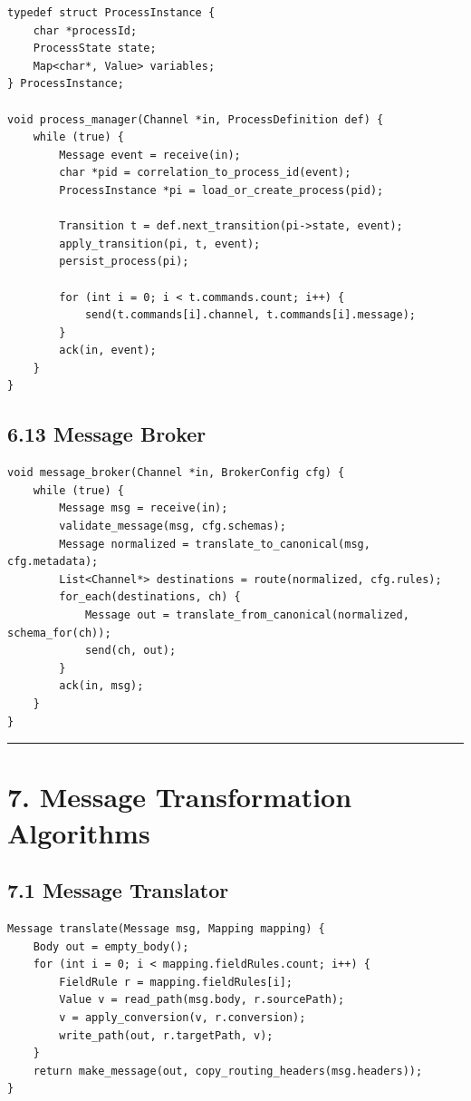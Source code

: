 \documentclass[11pt]{article}
\begin{document}
\begin{verbatim}
typedef struct ProcessInstance {
    char *processId;
    ProcessState state;
    Map<char*, Value> variables;
} ProcessInstance;

void process_manager(Channel *in, ProcessDefinition def) {
    while (true) {
        Message event = receive(in);
        char *pid = correlation_to_process_id(event);
        ProcessInstance *pi = load_or_create_process(pid);

        Transition t = def.next_transition(pi->state, event);
        apply_transition(pi, t, event);
        persist_process(pi);

        for (int i = 0; i < t.commands.count; i++) {
            send(t.commands[i].channel, t.commands[i].message);
        }
        ack(in, event);
    }
}
\end{verbatim}

\subsection{6.13 Message Broker}\label{message-broker}

\begin{verbatim}
void message_broker(Channel *in, BrokerConfig cfg) {
    while (true) {
        Message msg = receive(in);
        validate_message(msg, cfg.schemas);
        Message normalized = translate_to_canonical(msg, cfg.metadata);
        List<Channel*> destinations = route(normalized, cfg.rules);
        for_each(destinations, ch) {
            Message out = translate_from_canonical(normalized, schema_for(ch));
            send(ch, out);
        }
        ack(in, msg);
    }
}
\end{verbatim}

\begin{center}\rule{0.5\linewidth}{0.5pt}\end{center}

\section{7. Message Transformation
Algorithms}\label{message-transformation-algorithms}

\subsection{7.1 Message Translator}\label{message-translator}

\begin{verbatim}
Message translate(Message msg, Mapping mapping) {
    Body out = empty_body();
    for (int i = 0; i < mapping.fieldRules.count; i++) {
        FieldRule r = mapping.fieldRules[i];
        Value v = read_path(msg.body, r.sourcePath);
        v = apply_conversion(v, r.conversion);
        write_path(out, r.targetPath, v);
    }
    return make_message(out, copy_routing_headers(msg.headers));
}
\end{verbatim}
\end{document}
